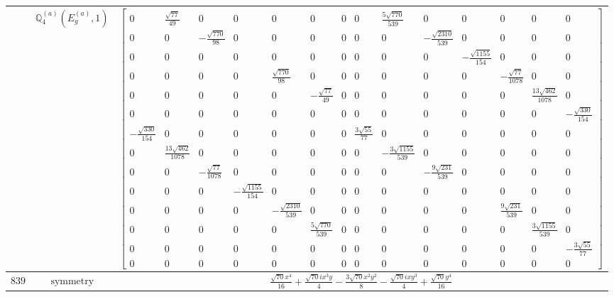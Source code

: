 \documentclass[fleqn,8pt,landscape]{jsarticle}
\begin{document}
\begin{longtable}{ccc}
$  $ & $ \mathbb{Q}_{4}^{(a)}(E_{g}^{(a)},1) $ & $ \begin{bmatrix} 0 & \frac{\sqrt{77}}{49} & 0 & 0 & 0 & 0 & 0 & 0 & \frac{5 \sqrt{770}}{539} & 0 & 0 & 0 & 0 & 0 \\ 0 & 0 & - \frac{\sqrt{770}}{98} & 0 & 0 & 0 & 0 & 0 & 0 & - \frac{\sqrt{2310}}{539} & 0 & 0 & 0 & 0 \\ 0 & 0 & 0 & 0 & 0 & 0 & 0 & 0 & 0 & 0 & - \frac{\sqrt{1155}}{154} & 0 & 0 & 0 \\ 0 & 0 & 0 & 0 & \frac{\sqrt{770}}{98} & 0 & 0 & 0 & 0 & 0 & 0 & - \frac{\sqrt{77}}{1078} & 0 & 0 \\ 0 & 0 & 0 & 0 & 0 & - \frac{\sqrt{77}}{49} & 0 & 0 & 0 & 0 & 0 & 0 & \frac{13 \sqrt{462}}{1078} & 0 \\ 0 & 0 & 0 & 0 & 0 & 0 & 0 & 0 & 0 & 0 & 0 & 0 & 0 & - \frac{\sqrt{330}}{154} \\ - \frac{\sqrt{330}}{154} & 0 & 0 & 0 & 0 & 0 & 0 & \frac{3 \sqrt{55}}{77} & 0 & 0 & 0 & 0 & 0 & 0 \\ 0 & \frac{13 \sqrt{462}}{1078} & 0 & 0 & 0 & 0 & 0 & 0 & - \frac{3 \sqrt{1155}}{539} & 0 & 0 & 0 & 0 & 0 \\ 0 & 0 & - \frac{\sqrt{77}}{1078} & 0 & 0 & 0 & 0 & 0 & 0 & - \frac{9 \sqrt{231}}{539} & 0 & 0 & 0 & 0 \\ 0 & 0 & 0 & - \frac{\sqrt{1155}}{154} & 0 & 0 & 0 & 0 & 0 & 0 & 0 & 0 & 0 & 0 \\ 0 & 0 & 0 & 0 & - \frac{\sqrt{2310}}{539} & 0 & 0 & 0 & 0 & 0 & 0 & \frac{9 \sqrt{231}}{539} & 0 & 0 \\ 0 & 0 & 0 & 0 & 0 & \frac{5 \sqrt{770}}{539} & 0 & 0 & 0 & 0 & 0 & 0 & \frac{3 \sqrt{1155}}{539} & 0 \\ 0 & 0 & 0 & 0 & 0 & 0 & 0 & 0 & 0 & 0 & 0 & 0 & 0 & - \frac{3 \sqrt{55}}{77} \\ 0 & 0 & 0 & 0 & 0 & 0 & 0 & 0 & 0 & 0 & 0 & 0 & 0 & 0 \end{bmatrix} $ \\ \hline
$ 839 $ & $ \text{symmetry} $ & $ \frac{\sqrt{70} x^{4}}{16} + \frac{\sqrt{70} i x^{3} y}{4} - \frac{3 \sqrt{70} x^{2} y^{2}}{8} - \frac{\sqrt{70} i x y^{3}}{4} + \frac{\sqrt{70} y^{4}}{16} $ \\

\end{longtable}
\end{document}
